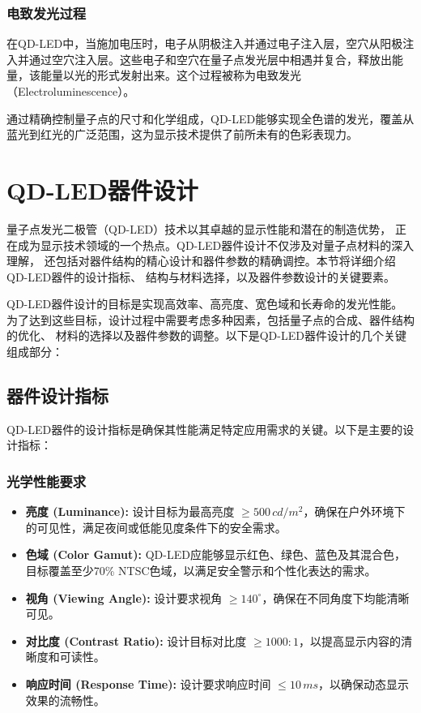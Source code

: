\documentclass[12pt,hyperref,a4paper,UTF8]{ctexart}
\begin{document}
\subsubsection*{电致发光过程}
在QD-LED中，当施加电压时，电子从阴极注入并通过电子注入层，空穴从阳极注入并通过空穴注入层。这些电子和空穴在量子点发光层中相遇并复合，释放出能量，该能量以光的形式发射出来。这个过程被称为电致发光（Electroluminescence）。


通过精确控制量子点的尺寸和化学组成，QD-LED能够实现全色谱的发光，覆盖从蓝光到红光的广泛范围，这为显示技术提供了前所未有的色彩表现力。





\newpage

\section{QD-LED器件设计}

量子点发光二极管（QD-LED）技术以其卓越的显示性能和潜在的制造优势，
正在成为显示技术领域的一个热点。QD-LED器件设计不仅涉及对量子点材料的深入理解，
还包括对器件结构的精心设计和器件参数的精确调控。本节将详细介绍QD-LED器件的设计指标、
结构与材料选择，以及器件参数设计的关键要素。

QD-LED器件设计的目标是实现高效率、高亮度、宽色域和长寿命的发光性能。
为了达到这些目标，设计过程中需要考虑多种因素，包括量子点的合成、器件结构的优化、
材料的选择以及器件参数的调整。以下是QD-LED器件设计的几个关键组成部分：


\subsection{器件设计指标}
QD-LED器件的设计指标是确保其性能满足特定应用需求的关键。以下是主要的设计指标：

\subsubsection*{光学性能要求}
\begin{itemize}
  \item \textbf{亮度 (Luminance):} 设计目标为最高亮度 $\geq 500 \, cd/m^2$，确保在户外环境下的可见性，满足夜间或低能见度条件下的安全需求。
  \item \textbf{色域 (Color Gamut):} QD-LED应能够显示红色、绿色、蓝色及其混合色，目标覆盖至少70\% NTSC色域，以满足安全警示和个性化表达的需求。
  \item \textbf{视角 (Viewing Angle):} 设计要求视角 $\geq 140^\circ$，确保在不同角度下均能清晰可见。
  \item \textbf{对比度 (Contrast Ratio):} 设计目标对比度 $\geq 1000:1$，以提高显示内容的清晰度和可读性。
  \item \textbf{响应时间 (Response Time):} 设计要求响应时间 $\leq 10 \, ms$，以确保动态显示效果的流畅性。
\end{itemize}
\end{document}
